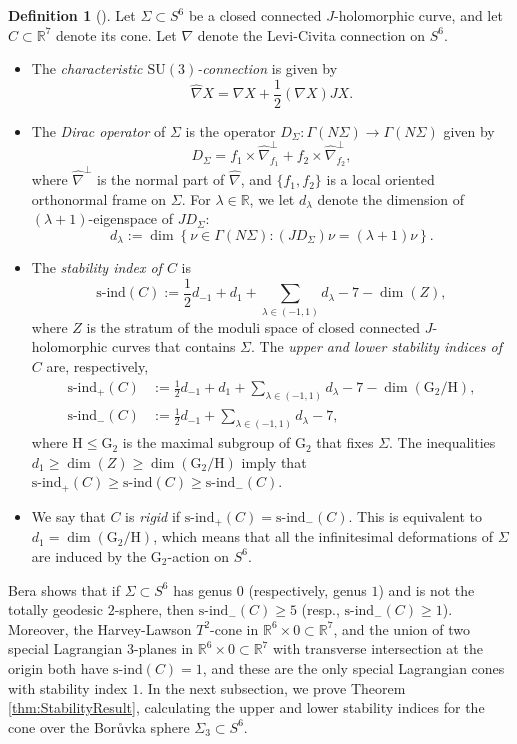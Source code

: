 \documentclass[11pt]{article}
\newcommand{\SU}{\mathrm{SU}}
\newcommand{\G}{\mathrm{G}}
\newcommand{\R}{\mathbb{R}}
\theoremstyle{definition}
\newtheorem{defn}[thm]{Definition}
\numberwithin{equation}{section}
\begin{document}
\begin{defn}[\cite{Bera23}] Let $\Sigma \subset S^6$ be a closed connected $J$-holomorphic curve, and let $C \subset \R^7$ denote its cone.  Let $\nabla$ denote the Levi-Civita connection on $S^6$.
\begin{itemize}
\item The \emph{characteristic $\SU(3)$-connection} is given by
$$\widehat{\nabla} X = \nabla X + \frac{1}{2}(\nabla X)JX.$$
\item The \emph{Dirac operator} of $\Sigma$ is the operator $D_\Sigma \colon \Gamma(N\Sigma) \to \Gamma(N\Sigma)$ given by
\begin{equation}
D_\Sigma = f_1 \times \widehat{\nabla}^\perp_{f_1} + f_2 \times \widehat{\nabla}^\perp_{f_2}, \label{eq:Dirac}
\end{equation}
where $\widehat{\nabla}^\perp$ is the normal part of $\widehat{\nabla}$, and $\{f_1, f_2\}$ is a local oriented orthonormal frame on $\Sigma$. For $\lambda \in \R$, we let $d_\lambda$ denote the dimension of $(\lambda+1)$-eigenspace of $JD_\Sigma$:
$$d_\lambda := \dim\!\left\{ \nu \in \Gamma(N\Sigma) \colon (JD_\Sigma)\nu = (\lambda + 1)\nu \right\}\!.$$
\item The \emph{stability index of $C$} is
$$\text{s-ind}(C) := \frac{1}{2}d_{-1} + d_1 + \sum_{\lambda \in (-1,1)} d_\lambda - 7 - \dim(Z),$$
where $Z$ is the stratum of the moduli space of closed connected $J$-holomorphic curves that contains $\Sigma$.  The \emph{upper and lower stability indices of $C$} are, respectively,
\begin{align*}
\text{s-ind}_+(C) & := \frac{1}{2}d_{-1} + d_1 + \sum_{\lambda \in (-1,1)} d_\lambda - 7 - \dim(\G_2/\mathrm{H}),  \\
\text{s-ind}_-(C) & := \frac{1}{2}d_{-1} + \sum_{\lambda \in (-1,1)} d_\lambda - 7,  \
\end{align*}
where $\mathrm{H} \leq \G_2$ is the maximal subgroup of $\G_2$ that fixes $\Sigma$.  The inequalities $d_1 \geq \dim(Z) \geq \dim(\G_2/\mathrm{H})$ imply that $\text{s-ind}_+(C) \geq \text{s-ind}(C) \geq \text{s-ind}_-(C)$.
\item We say that $C$ is \emph{rigid} if $\text{s-ind}_+(C) = \text{s-ind}_-(C)$.  This is equivalent to $d_1 = \dim(\G_2/\mathrm{H})$, which means that all the infinitesimal deformations of $\Sigma$ are induced by the $\G_2$-action on $S^6$.
\end{itemize}
\end{defn}

\indent Bera shows \cite[Theorem 1.10]{Bera23} that if $\Sigma \subset S^6$ has genus $0$ (respectively, genus $1$) and is not the totally geodesic $2$-sphere, then $\text{s-ind}_-(C) \geq 5$ (resp., $\text{s-ind}_-(C) \geq 1$).  Moreover, the Harvey-Lawson $T^2$-cone in $\R^6 \times 0 \subset \R^7$, and the union of two special Lagrangian $3$-planes in $\R^6 \times 0 \subset \R^7$ with transverse intersection at the origin both have $\text{s-ind}(C) = 1$, and these are the only special Lagrangian cones with stability index $1$.  In the next subsection, we prove Theorem \ref{thm:StabilityResult}, calculating the upper and lower stability indices for the cone over the Bor{\r{u}}vka sphere $\Sigma_3 \subset S^6$. 
\end{document}
